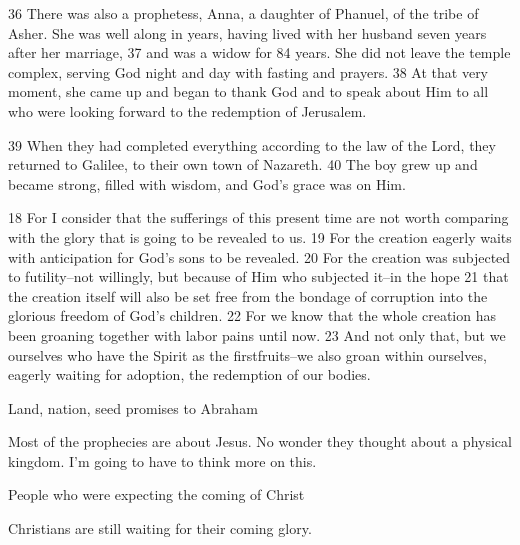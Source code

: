 \begin{bible}
36 There was also a prophetess, Anna, a daughter of Phanuel, of the tribe of Asher. She was well along in years, having lived with her husband seven years after her marriage, 37 and was a widow for 84 years. She did not leave the temple complex, serving God night and day with fasting and prayers. 38 At that very moment, she came up and began to thank God and to speak about Him to all who were looking forward to the redemption of Jerusalem.

39 When they had completed everything according to the law of the Lord, they returned to Galilee, to their own town of Nazareth. 40 The boy grew up and became strong, filled with wisdom, and God's grace was on Him.


18 For I consider that the sufferings of this present time are not worth comparing with the glory that is going to be revealed to us. 19 For the creation eagerly waits with anticipation for God's sons to be revealed. 20 For the creation was subjected to futility--not willingly, but because of Him who subjected it--in the hope 21 that the creation itself will also be set free from the bondage of corruption into the glorious freedom of God's children. 22 For we know that the whole creation has been groaning together with labor pains until now. 23 And not only that, but we ourselves who have the Spirit as the firstfruits--we also groan within ourselves, eagerly waiting for adoption, the redemption of our bodies.

\end{bible}

\begin{discussion}



 Land, nation, seed promises to Abraham 

Most of the prophecies are about Jesus.  No wonder they thought about a physical kingdom.  I'm going to have to think more on this.


 People who were expecting the coming of Christ



 Christians are still waiting for their coming glory.

\end{discussion}

